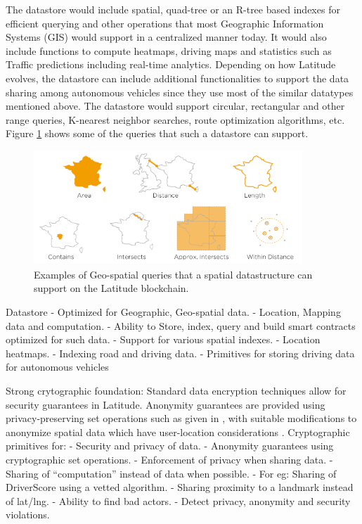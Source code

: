 The datastore would include spatial, quad-tree or an R-tree based indexes for efficient querying and other operations that
most Geographic Information Systems (GIS) would support in a centralized manner today. It would also include functions
to compute heatmaps, driving maps and statistics such as Traffic predictions including real-time analytics. Depending on
how Latitude evolves, the datastore can include additional functionalities to support the data sharing among autonomous
vehicles since they use most of the similar datatypes mentioned above. The datastore would support circular, rectangular
and other range queries, K-nearest neighbor searches, route optimization algorithms, etc. Figure
\ref{fig:geo_spatial_query} shows some of the queries that such a datastore can support.

\begin{figure}[t]
    \centering
    \includegraphics[width=0.90\textwidth]{geospatial_query.png}
  \caption{Examples of Geo-spatial queries that a spatial datastructure can support on the Latitude blockchain.}
    \label{fig:geo_spatial_query}
\end{figure}


Datastore
 - Optimized for Geographic, Geo-spatial data.
 - Location, Mapping data and computation.
 - Ability to Store, index, query and build smart contracts optimized for such data.
 - Support for various spatial indexes.
 - Location heatmaps.
 - Indexing road and driving data.
 - Primitives for storing driving data for autonomous vehicles

\noindent
{\textsf Strong crytographic foundation:}
Standard data encryption techniques allow for security guarantees in Latitude. Anonymity guarantees are provided using
privacy-preserving set operations such as given in \cite{kissner_set}, with suitable modifications to
anonymize spatial data which have user-location considerations \cite{divanis_kanon,xu_loc_anon}.
Cryptographic primitives for:
 - Security and privacy of data.
 - Anonymity guarantees using cryptographic set operations.
 - Enforcement of privacy when sharing data.
 - Sharing of “computation” instead of data when possible.
 - For eg: Sharing of DriverScore using a vetted algorithm.
 - Sharing proximity to a landmark instead of lat/lng.
 - Ability to find bad actors.
 - Detect privacy, anonymity and security violations.

